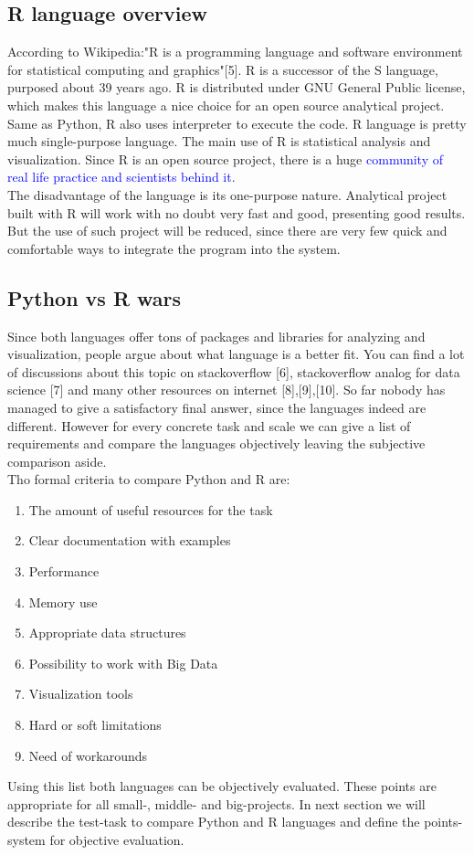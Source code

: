 \documentclass{article}
\begin{document}
\subsection{R language overview}
According to Wikipedia:"R is a programming language and software environment for statistical computing and graphics"[5]. R is a successor of the S language, purposed about 39 years ago. R is distributed under GNU General Public license, which makes this language a nice choice for an open source analytical project.\\
Same as Python, R also uses interpreter to execute the code. R language is pretty much single-purpose language. The main use of R is statistical analysis and visualization. Since R is an open source project, there is a huge \textcolor{blue}{community of real life practice and scientists behind it}.\\
The disadvantage of the language is its one-purpose nature. Analytical project built with R will work with no doubt very fast and good, presenting good results. But the use of such project will be reduced, since there are very few quick and comfortable ways to integrate the program into the system.\\

\subsection{Python vs R wars}
Since both languages offer tons of packages and libraries for analyzing and visualization, people argue about what language is a better fit. You can find a lot of discussions about this topic on stackoverflow [6], stackoverflow analog for data science [7] and many other resources on internet [8],[9],[10].
So far nobody has managed to give a satisfactory final answer, since the languages indeed are different. However for every concrete task and scale we can give a list of requirements and compare the languages objectively leaving the subjective comparison aside.\\
Tho formal criteria to compare Python and R are:
\begin{enumerate}
    \item The amount of useful resources for the task
    \item Clear documentation with examples
    \item Performance
    \item Memory use
    \item Appropriate data structures
    \item Possibility to work with Big Data
    \item Visualization tools
    \item Hard or soft limitations
    \item Need of workarounds
\end{enumerate}
Using this list both languages can be objectively evaluated. These points are appropriate for all small-, middle- and big-projects. In next section we will describe the test-task to compare Python and R languages and define the points-system for objective evaluation.\\
\end{document}
